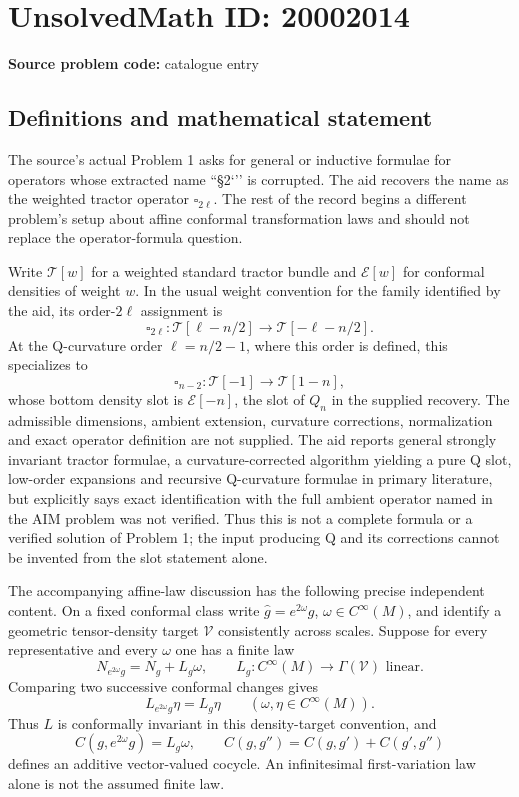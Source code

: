 \documentclass[11pt]{article}
\begin{document}
\section*{UnsolvedMath ID: 20002014}
\textbf{Source problem code:} catalogue entry
\subsection{Definitions and mathematical statement}
The source's actual Problem 1 asks for general or inductive formulae for operators whose extracted name ``§2`'' is corrupted. The aid recovers the name as the weighted tractor operator \(\square_{2\ell}\). The rest of the record begins a different problem's setup about affine conformal transformation laws and should not replace the operator-formula question.

Write \(\mathcal T[w]\) for a weighted standard tractor bundle and \(\mathcal E[w]\) for conformal densities of weight \(w\). In the usual weight convention for the family identified by the aid, its order-\(2\ell\) assignment is
\[
 \square_{2\ell}:\mathcal T[\ell-n/2]
              \longrightarrow\mathcal T[-\ell-n/2].
\]
At the Q-curvature order \(\ell=n/2-1\), where this order is defined, this specializes to
\[
 \square_{n-2}:\mathcal T[-1]\longrightarrow\mathcal T[1-n],
\]
whose bottom density slot is \(\mathcal E[-n]\), the slot of \(Q_n\) in the supplied recovery. The admissible dimensions, ambient extension, curvature corrections, normalization and exact operator definition are not supplied. The aid reports general strongly invariant tractor formulae, a curvature-corrected algorithm yielding a pure Q slot, low-order expansions and recursive Q-curvature formulae in primary literature, but explicitly says exact identification with the full ambient operator named in the AIM problem was not verified. Thus this is not a complete formula or a verified solution of Problem 1; the input producing Q and its corrections cannot be invented from the slot statement alone.

The accompanying affine-law discussion has the following precise independent content. On a fixed conformal class write \(\widehat g=e^{2\omega}g\), \(\omega\in C^\infty(M)\), and identify a geometric tensor-density target \(\mathcal V\) consistently across scales. Suppose for every representative and every \(\omega\) one has a finite law
\[
 N_{e^{2\omega}g}=N_g+L_g\omega,
 \qquad L_g:C^\infty(M)\to\Gamma(\mathcal V)\text{ linear}.
\]
Comparing two successive conformal changes gives
\[
 L_{e^{2\omega}g}\eta=L_g\eta
 \qquad(\omega,\eta\in C^\infty(M)).
\]
Thus \(L\) is conformally invariant in this density-target convention, and
\[
 C(g,e^{2\omega}g)=L_g\omega,\qquad
 C(g,g'')=C(g,g')+C(g',g'')
\]
defines an additive vector-valued cocycle. An infinitesimal first-variation law alone is not the assumed finite law.
\end{document}

